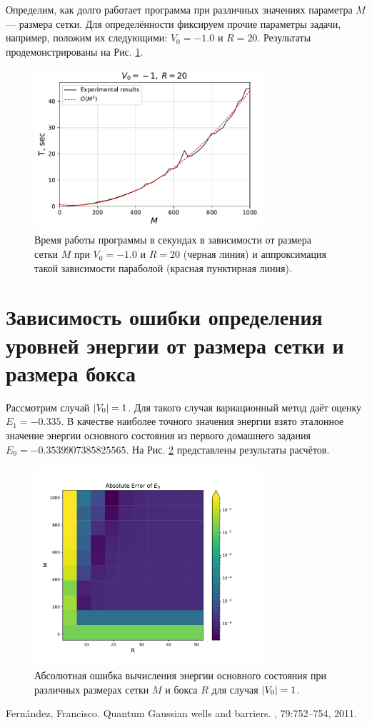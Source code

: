 \documentclass[10pt]{article}
\begin{document}
Определим, как долго работает программа при различных значениях параметра $M$ --- размера сетки. Для определённости фиксируем прочие параметры задачи, например, положим их следующими: $V_0 = -1.0$ и $R=20$. Результаты продемонстрированы на Рис. \ref{fig:T_vs_M}.
\begin{figure}[htbp]
    \centering
    \includegraphics[width=0.75\textwidth]{../figures/T_vs_M}
    \caption{Время работы программы в секундах в зависимости от размера сетки $M$ при $V_0 = -1.0$ и $R=20$ (черная линия) и аппроксимация такой зависимости параболой (красная пунктирная линия).}
    \label{fig:T_vs_M}
\end{figure}

\section{Зависимость ошибки определения уровней энергии от размера сетки и размера бокса}

Рассмотрим случай $\abs{V_0}=1$. Для такого случая вариационный метод даёт оценку $E_1 = -0.335$. В качестве наиболее точного значения энергии взято эталонное значение энергии основного состояния из первого домашнего задания $E_0 = -0.3539907385825565$. На Рис. \ref{fig:abserr} представлены результаты расчётов.
\begin{figure}[htbp]
    \centering
    \includegraphics[width=0.75\textwidth]{../figures/abserr}
    \caption{Абсолютная ошибка вычисления энергии основного состояния при различных размерах сетки $M$ и бокса $R$ для случая $\abs{V_0}=1$.}
    \label{fig:abserr}
\end{figure}



\begin{thebibliography}{10}
    Fernández, Francisco.
    \newblock Quantum Gaussian wells and barriers.
    , 79:752--754, 2011.
\end{thebibliography}
\end{document}
